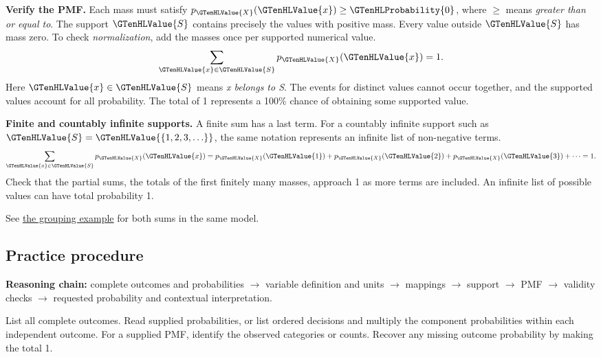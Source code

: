 \textbf{Verify the PMF.} Each mass must satisfy $p_{\GTenHLValue{X}}(\GTenHLValue{x})\geq\GTenHLProbability{0}$, where $\geq$ means \emph{greater than or equal to}. The support $\GTenHLValue{S}$ contains precisely the values with positive mass. Every value outside $\GTenHLValue{S}$ has mass zero. To check \emph{normalization}, add the masses once per supported numerical value.
\[
\sum_{\GTenHLValue{x}\in\GTenHLValue{S}}p_{\GTenHLValue{X}}(\GTenHLValue{x})=1.
\]
Here $\GTenHLValue{x}\in\GTenHLValue{S}$ means \emph{x belongs to S}. The events for distinct values cannot occur together, and the supported values account for all probability. The total of 1 represents a 100\% chance of obtaining some supported value.

\textbf{Finite and countably infinite supports.} A finite sum has a last term. For a countably infinite support such as $\GTenHLValue{S}=\GTenHLValue{\{1,2,3,\ldots\}}$, the same notation represents an infinite list of non-negative terms.
\[
\sum_{\GTenHLValue{x}\in\GTenHLValue{S}}p_{\GTenHLValue{X}}(\GTenHLValue{x})=p_{\GTenHLValue{X}}(\GTenHLValue{1})+p_{\GTenHLValue{X}}(\GTenHLValue{2})+p_{\GTenHLValue{X}}(\GTenHLValue{3})+\cdots=1.
\]
Check that the partial sums, the totals of the first finitely many masses, approach 1 as more terms are included. An infinite list of possible values can have total probability 1.

See \hyperref[subsec:t2-c1-introductory-general-problem-grouping-outcomes]{the grouping example} for both sums in the same model.


\subsection{Practice procedure}
\label{subsec:t2-c1-practice-procedure}

\textbf{Reasoning chain:} complete outcomes and probabilities $\to$ variable definition and units $\to$ mappings $\to$ support $\to$ PMF $\to$ validity checks $\to$ requested probability and contextual interpretation.

\noindent{} List all complete outcomes. Read supplied probabilities, or list ordered decisions and multiply the component probabilities within each independent outcome. For a supplied PMF, identify the observed categories or counts. Recover any missing outcome probability by making the total 1.

